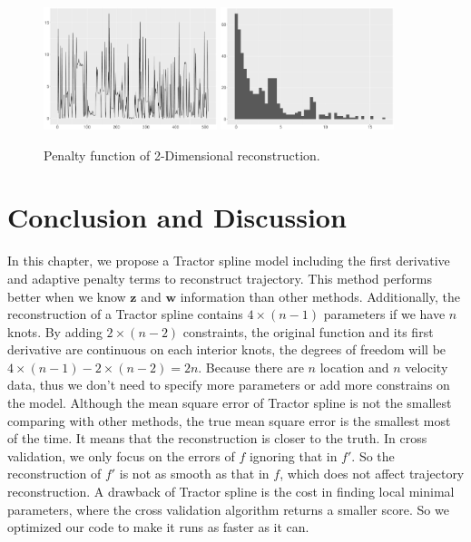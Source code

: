 \begin{figure}
  \centering
    \includegraphics[width=0.45\textwidth]{Chapters/02TractorSplineTheory/plot/ggplot/ggRealdataXYPenaltyLine}
    \includegraphics[width=0.45\textwidth]{Chapters/02TractorSplineTheory/plot/ggplot/ggRealdataXYPenaltyHist} 
  \caption{Penalty function of 2-Dimensional reconstruction.}\label{2dpenalty}
\end{figure}


\clearpage

\section{Conclusion and Discussion}
In this chapter, we propose a Tractor spline model including the first derivative and adaptive penalty terms to reconstruct trajectory. This method performs better when we know $\mathbf{z}$ and $\mathbf{w}$ information than other methods. Additionally, the reconstruction of a Tractor spline contains $4\times (n-1)$ parameters if we have $n$ knots. By adding $2\times (n-2)$ constraints, the original function and its first derivative are continuous on each interior knots, the degrees of freedom will be $4\times (n-1)-2\times (n-2)=2n$. Because there are $n$ location and $n$ velocity data, thus we don't need to specify more parameters or add more constrains on the model. Although the mean square error of Tractor spline is not the smallest comparing with other methods, the true mean square error is the smallest most of the time. It means that the reconstruction is closer to the truth. In cross validation, we only focus on the errors of $f$ ignoring that in $f'$. So the reconstruction of $f'$ is not as smooth as that in $f$, which does not affect trajectory reconstruction. A drawback of Tractor spline is the cost in finding local minimal parameters, where the cross validation algorithm returns a smaller score. So we optimized our code to make it runs as faster as it can.







